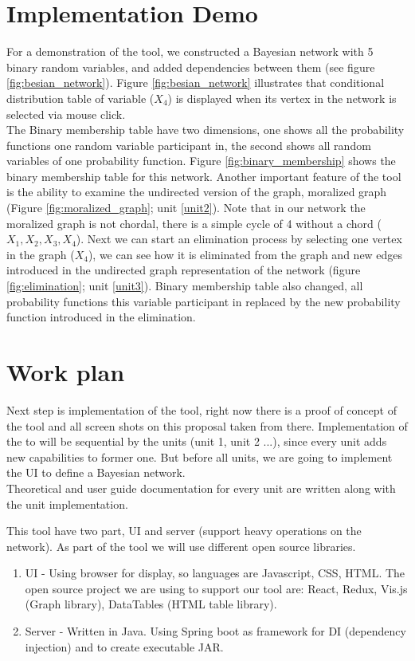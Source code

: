 \documentclass{article}
\begin{document}
    \section{Implementation Demo}\label{sec:demo}
    For a demonstration of the tool, we constructed a Bayesian network with 5 binary random variables, and added dependencies between them (see figure \ref{fig:besian_network}). Figure \ref{fig:besian_network} illustrates that conditional distribution table of variable ($X_4$) is displayed when its vertex in the network is selected via mouse click.\\

    The Binary membership table have two dimensions, one shows all the probability functions one random variable participant in, the second shows all random variables of one probability function. Figure \ref{fig:binary_membership} shows the binary membership table for this network.
    Another important feature of the tool is the ability to examine the undirected version of the graph, moralized graph (Figure \ref{fig:moralized_graph}; unit \ref{unit2}).
    Note that in our network the moralized graph is not chordal, there is a simple cycle of 4 without a chord ($X_1, X_2, X_3, X_4$).
    Next we can start an elimination process by selecting one vertex in the graph ($X_4$), we can see how it is eliminated from the graph and new edges introduced in the undirected graph representation of the network (figure \ref{fig:elimination}; unit \ref{unit3}). Binary membership table also changed, all probability functions this variable participant in replaced by the new probability function introduced in the elimination.

    \section{Work plan}
    Next step is implementation of the tool, right now there is a proof of concept of the tool and all screen shots on this proposal taken from there. Implementation of the to will be sequential by the units (unit 1, unit 2 ...), since every unit adds new capabilities to former one. But before all units, we are going to implement the UI to define a Bayesian network.\\ Theoretical and user guide documentation for every unit are written along with the unit implementation.

    This tool have two part, UI and server (support heavy operations on the network). As part of the tool we will use different open source libraries. 
    \begin{enumerate}
        \item UI - Using browser for display, so languages are Javascript, CSS, HTML. The open source project we are using to support our tool are: React, Redux, Vis.js (Graph library), DataTables (HTML table library).
        \item Server - Written in Java. Using Spring boot as framework for DI (dependency injection) and to create executable JAR.
    \end{enumerate}
\end{document}
